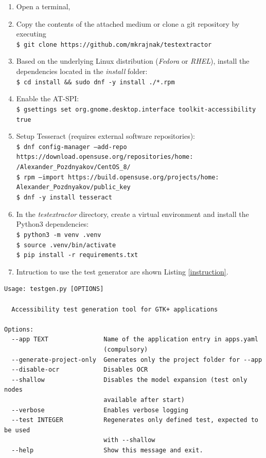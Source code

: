 \begin{enumerate}
    \item Open a terminal,
    \item Copy the contents of the attached medium or clone a git repository by executing \\ {\texttt{\$ git clone https://github.com/mkrajnak/testextractor}}
    \item Based on the underlying Linux distribution (\textit{Fedora} or \textit{RHEL}), install the dependencies located in the \textit{install} folder: \\ \texttt{\$ cd install \&\& sudo dnf -y install ./*.rpm}
    \item Enable the AT-SPI: \\ 
    \texttt{\$ gsettings set org.gnome.desktop.interface toolkit-accessibility true}
    \item Setup Tesseract (requires external software repositories): \\
    \texttt{\$ dnf config-manager --add-repo \\ https://download.opensuse.org/repositories/home:\\/Alexander\_Pozdnyakov/CentOS\_8/} \\
    \texttt{\$ rpm --import https://build.opensuse.org/projects/home:\\Alexander\_Pozdnyakov/public\_key}\\
    \texttt{\$ dnf -y install tesseract}\\
    \item In the \textit{testextractor} directory, create a virtual environment and install the Python3 dependencies: \\
    \texttt{\$ python3 -m venv .venv}\\
    \texttt{\$ source .venv/bin/activate}\\
    \texttt{\$ pip install -r requirements.txt}\\
    
    \item Intruction to use the test generator are shown Listing \ref{instruction}.
\end{enumerate}

\begin{minipage}{\linewidth}
\begin{lstlisting}[caption={output of \texttt{./testgen.py -{}-help}},label={instruction}]
Usage: testgen.py [OPTIONS]

  Accessibility test generation tool for GTK+ applications

Options:
  --app TEXT               Name of the application entry in apps.yaml
                           (compulsory)
  --generate-project-only  Generates only the project folder for --app
  --disable-ocr            Disables OCR
  --shallow                Disables the model expansion (test only nodes      
                           available after start)
  --verbose                Enables verbose logging
  --test INTEGER           Regenerates only defined test, expected to be used
                           with --shallow
  --help                   Show this message and exit.
\end{lstlisting}
\end{minipage}


